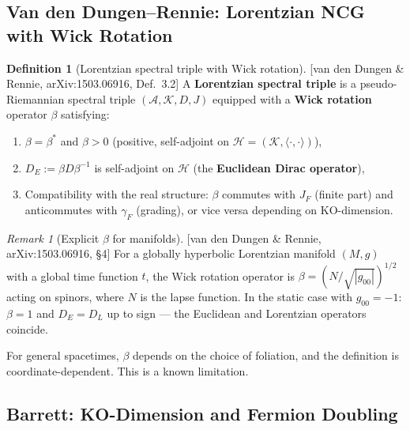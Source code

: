 \documentclass[12pt,a4paper]{article}
\theoremstyle{definition}
\newtheorem{definition}[proposition]{Definition}
\theoremstyle{remark}
\newtheorem{remark}[proposition]{Remark}
\newcommand{\fromlit}[1]{\textcolor{blue!70!black}{\textsf{[#1]}}}
\begin{document}
\subsection{Van den Dungen--Rennie: Lorentzian NCG with Wick Rotation}

\begin{definition}[Lorentzian spectral triple with Wick rotation]
\label{def:vdD-rennie}
\fromlit{van den Dungen \& Rennie, arXiv:1503.06916, Def.~3.2}
A \textbf{Lorentzian spectral triple} is a pseudo-Riemannian
spectral triple $(\mathcal{A}, \mathcal{K}, D, J)$ equipped with a
\textbf{Wick rotation} operator $\beta$ satisfying:
\begin{enumerate}[nosep,label=(\roman*)]
  \item $\beta = \beta^*$ and $\beta > 0$ (positive, self-adjoint on
    $\mathcal{H} = (\mathcal{K}, \langle\cdot,\cdot\rangle)$),
  \item $D_E := \beta D \beta^{-1}$ is self-adjoint on $\mathcal{H}$
    (the \textbf{Euclidean Dirac operator}),
  \item Compatibility with the real structure: $\beta$ commutes with
    $J_F$ (finite part) and anticommutes with $\gamma_F$ (grading), or
    vice versa depending on KO-dimension.
\end{enumerate}
\end{definition}

\begin{remark}[Explicit $\beta$ for manifolds]
\fromlit{van den Dungen \& Rennie, arXiv:1503.06916, \S4}
For a globally hyperbolic Lorentzian manifold $(M,g)$ with a global
time function $t$, the Wick rotation operator is
$\beta = (N/\sqrt{|g_{00}|})^{1/2}$ acting on spinors, where $N$ is
the lapse function.  In the static case with $g_{00} = -1$:
$\beta = 1$ and $D_E = D_L$ up to sign --- the Euclidean and
Lorentzian operators coincide.

For general spacetimes, $\beta$ depends on the choice of foliation,
and the definition is coordinate-dependent.  This is a known limitation.
\end{remark}


\subsection{Barrett: KO-Dimension and Fermion Doubling}
\end{document}
